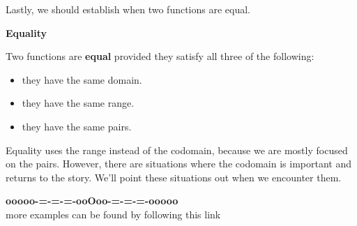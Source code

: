 \documentclass{ximera}
\begin{document}
Lastly, we should establish when two functions are equal. 








\begin{definition} \textbf{\textcolor{green!50!black}{Equality}}

Two functions are \textbf{equal} provided they satisfy all three of the following:

\begin{itemize}
\item they have the same domain.
\item they have the same range.
\item they have the same pairs.
\end{itemize}

\end{definition}
Equality uses the range instead of the codomain, because we are mostly focused on the pairs.  However, there are situations where the codomain is important and returns to the story.  We'll point these situations out when we encounter them.













\begin{onlineOnly}
\begin{center}
\textbf{\textcolor{green!50!black}{ooooo-=-=-=-ooOoo-=-=-=-ooooo}} \\

more examples can be found by following this link\\ 

\end{center}
\end{onlineOnly}
\end{document}
